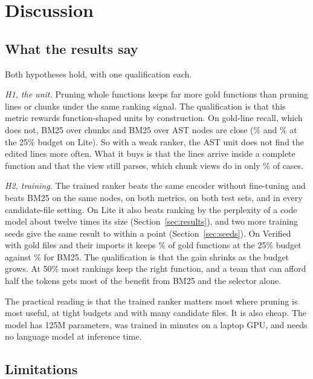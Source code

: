 \section{Discussion}
\label{sec:discussion}

\subsection{What the results say}

Both hypotheses hold, with one qualification each.

\emph{H1, the unit.} Pruning whole functions keeps far more gold functions than pruning lines or chunks under the same ranking signal. The qualification is that this metric rewards function-shaped units by construction. On gold-line recall, which does not, BM25 over chunks and BM25 over AST nodes are close (\% and \% at the 25\% budget on Lite). So with a weak ranker, the AST unit does not find the edited lines more often. What it buys is that the lines arrive inside a complete function and that the view still parses, which chunk views do in only \% of cases.

\emph{H2, training.} The trained ranker beats the same encoder without fine-tuning and beats BM25 on the same nodes, on both metrics, on both test sets, and in every candidate-file setting. On Lite it also beats ranking by the perplexity of a code model about twelve times its size (Section~\ref{sec:results}), and two more training seeds give the same result to within a point (Section~\ref{sec:seeds}). On Verified with gold files and their imports it keeps \% of gold functions at the 25\% budget against \% for BM25. The qualification is that the gain shrinks as the budget grows. At 50\% most rankings keep the right function, and a team that can afford half the tokens gets most of the benefit from BM25 and the selector alone.

The practical reading is that the trained ranker matters most where pruning is most useful, at tight budgets and with many candidate files. It is also cheap. The model has 125M parameters, was trained in  minutes on a laptop GPU, and needs no language model at inference time.

\subsection{Limitations}

